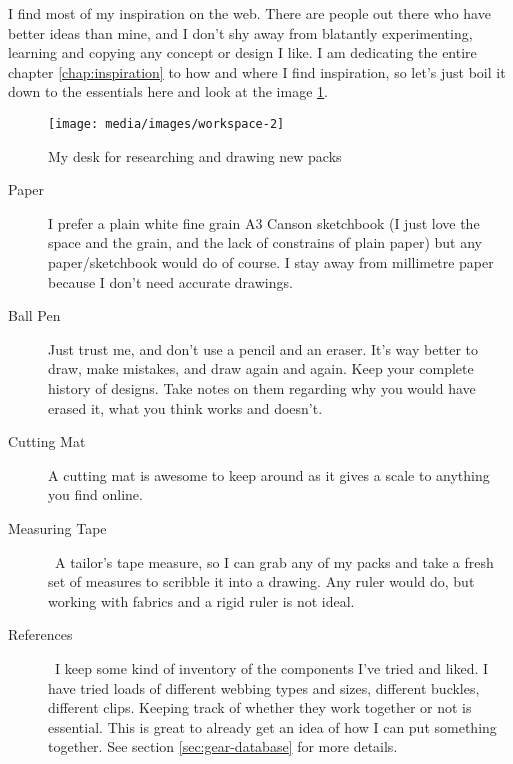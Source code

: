 I find most of my inspiration on the web. There are people out there who have better ideas than mine, and I don’t shy away from blatantly experimenting, learning and copying any concept or design I like. I am dedicating the entire chapter \ref{chap:inspiration} to how and where I find inspiration, so let’s just boil it down to the essentials here and look at the image \ref{img:workspace-2}.

\begin{figure}
  \texttt{[image: media/images/workspace-2]}
  \caption{My desk for researching and drawing new packs}
  \label{img:workspace-2}
\end{figure}

\begin{description}

  \item[Paper] I prefer a plain white fine grain A3 Canson sketchbook (I just love the space and the grain, and the lack of constrains of plain paper) but any paper/sketchbook would do of course. I stay away from millimetre paper because I don’t need accurate drawings.

  \item [Ball Pen] Just trust me, and don’t use a pencil and an eraser. It’s way better to draw, make mistakes, and draw again and again. Keep your complete history of designs. Take notes on them regarding why you would have erased it, what you think works and doesn’t.

  \item [Cutting Mat] A cutting mat is awesome to keep around as it gives a scale to anything you find online.

  \item [Measuring Tape] A tailor’s tape measure, so I can grab any of my packs and take a fresh set of measures to scribble it into a drawing. Any ruler would do, but working with fabrics and a rigid ruler is not ideal.

  \item [References] I keep some kind of inventory of the components I’ve tried and liked. I have tried loads of different webbing types and sizes, different buckles, different clips. Keeping track of whether they work together or not is essential. This is great to already get an idea of how I can put something together. See section \ref{sec:gear-database} for more details.

\end{description}
